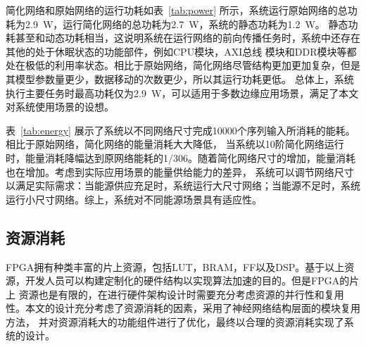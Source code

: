 简化网络和原始网络的运行功耗如表~\ref{tab:power} 所示，系统运行原始网络的总功耗为2.9~W，运行简化网络的总功耗为2.7~W，系统的静态功耗为1.2~W。
静态功耗甚至和动态功耗相当，这说明系统在运行网络的前向传播任务时，系统中还存在其他的处于休眠状态的功能部件，例如CPU模块，AXI总线
模块和DDR模块等都处在极低的利用率状态。相比于原始网络，简化网络尽管结构更加更加复杂，但是其模型参数量更少，数据移动的次数更少，所以其运行功耗更低。
总体上，系统执行主要任务时最高功耗仅为2.9~W，可以适用于多数边缘应用场景，满足了本文对系统使用场景的设想。


表~\ref{tab:energy} 展示了系统以不同网络尺寸完成10000个序列输入所消耗的能耗。相比于原始网络，简化网络的能量消耗大大降低，
当系统以10阶简化网络运行时，能量消耗降幅达到原网络能耗的1/306。随着简化网络尺寸的增加，能量消耗也在增加。考虑到实际应用场景的能量供给能力的差异，
系统可以调节网络尺寸以满足实际需求：当能源供应充足时，系统运行大尺寸网络；当能源不足时，系统运行小尺寸网络。综上，系统对不同能源场景具有适应性。






%
%
\subsection{资源消耗}
FPGA拥有种类丰富的片上资源，包括LUT，BRAM，FF以及DSP。基于以上资源，开发人员可以构建定制化的硬件结构以实现算法加速的目的。但是FPGA的片上
资源也是有限的，在进行硬件架构设计时需要充分考虑资源的并行性和复用性。本文的设计充分考虑了资源消耗的因素，采用了神经网络结构层面的模块复用方法，
并对资源消耗大的功能组件进行了优化，最终以合理的资源消耗实现了系统的设计。



